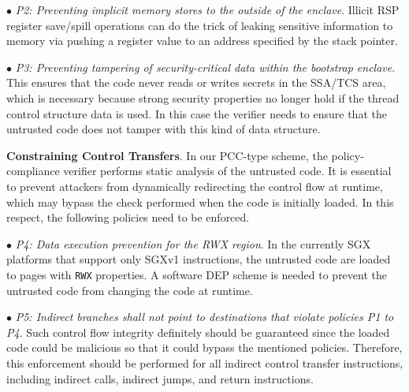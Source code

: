 {\vspace{2pt}\noindent$\bullet$\textit{ P2: Preventing implicit memory stores to the outside of the enclave}. Illicit RSP register save/spill operations can do the trick of leaking sensitive information to memory via pushing a register value to an address specified by the stack pointer. 

\vspace{2pt}\noindent$\bullet$\textit{ P3: Preventing tampering of security-critical data within the bootstrap enclave}. This ensures that the code never reads or writes secrets in the SSA/TCS area, which is necessary because strong security properties no longer hold if the thread control structure data is used. In this case the verifier needs to ensure that the untrusted code does not tamper with this kind of data structure.

\vspace{3pt}\noindent\textbf{Constraining Control Transfers}. 
In our PCC-type scheme, the policy-compliance verifier performs static analysis of the untrusted code. It is essential to prevent attackers from dynamically redirecting the control flow at runtime, which may bypass the check performed when the code is initially loaded. In this respect, the following policies need to be enforced. 

\vspace{2pt}\noindent$\bullet$\textit{ P4: Data execution prevention for the RWX region}. In the currently SGX platforms that support only SGXv1 instructions, the untrusted code are loaded to pages with \texttt{RWX} properties. A software DEP scheme is needed to prevent the untrusted code from changing the code at runtime.

\vspace{2pt}\noindent$\bullet$\textit{ P5: Indirect branches shall not point to destinations that violate policies P1 to P4}. Such control flow integrity definitely should be guaranteed since the loaded code could be malicious so that it could bypass the mentioned policies. Therefore, this enforcement should be performed for all indirect control transfer instructions, including indirect calls, indirect jumps, and return instructions.

}

